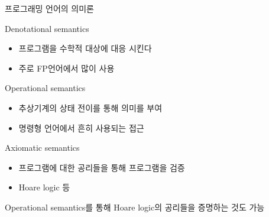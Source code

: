 \documentclass{beamer}
\begin{document}
\begin{frame}{프로그래밍 언어의 의미론}

  \begin{block}{Denotational semantics}
    \begin{itemize}
      \item 프로그램을 수학적 대상에 대응 시킨다
      \item 주로 FP언어에서 많이 사용
    \end{itemize}
  \end{block}
  
  \pause
  \begin{block}{Operational semantics}
    \begin{itemize}
      \item 추상기계의 상태 전이를 통해 의미를 부여
      \item 명령형 언어에서 흔히 사용되는 접근
    \end{itemize}
  \end{block}

  \pause
  \begin{block}{Axiomatic semantics}
    \begin{itemize}
      \item 프로그램에 대한 공리들을 통해 프로그램을 검증
      \item Hoare logic 등
    \end{itemize}
  \end{block}

  \pause
  \footnotesize Operational semantics를 통해 Hoare logic의 공리들을 증명하는 것도 가능

\end{frame}
\end{document}

